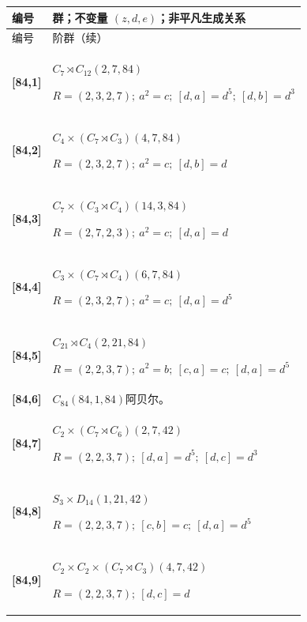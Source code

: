 \documentclass[UTF8,fontset=fandol,11pt,a4paper]{ctexart}
\begin{document}
\begin{longtable}{@{}p{17mm}>{\raggedright\arraybackslash}p{141mm}@{}}

\toprule 编号 & 群；不变量 $(z,d,e)$；非平凡生成关系\\\midrule\endfirsthead

\toprule 编号 & 84 阶群（续）\\\midrule\endhead\bottomrule\endfoot

\textbf{[84,1]} & $C_{7}\rtimes C_{12}$\quad $(2,7,84)$\par\(R=(2,3,2,7);\allowbreak\ a^{2}=c;\allowbreak\ [d,a]=d^{5};\allowbreak\ [d,b]=d^{3}\)\\[3pt]

\textbf{[84,2]} & $C_{4}\times (C_{7}\rtimes C_{3})$\quad $(4,7,84)$\par\(R=(2,3,2,7);\allowbreak\ a^{2}=c;\allowbreak\ [d,b]=d\)\\[3pt]

\textbf{[84,3]} & $C_{7}\times (C_{3}\rtimes C_{4})$\quad $(14,3,84)$\par\(R=(2,7,2,3);\allowbreak\ a^{2}=c;\allowbreak\ [d,a]=d\)\\[3pt]

\textbf{[84,4]} & $C_{3}\times (C_{7}\rtimes C_{4})$\quad $(6,7,84)$\par\(R=(2,3,2,7);\allowbreak\ a^{2}=c;\allowbreak\ [d,a]=d^{5}\)\\[3pt]

\textbf{[84,5]} & $C_{21}\rtimes C_{4}$\quad $(2,21,84)$\par\(R=(2,2,3,7);\allowbreak\ a^{2}=b;\allowbreak\ [c,a]=c;\allowbreak\ [d,a]=d^{5}\)\\[3pt]

\textbf{[84,6]} & $C_{84}$\quad $(84,1,84)$\quad 阿贝尔。\\[3pt]

\textbf{[84,7]} & $C_{2}\times (C_{7}\rtimes C_{6})$\quad $(2,7,42)$\par\(R=(2,2,3,7);\allowbreak\ [d,a]=d^{5};\allowbreak\ [d,c]=d^{3}\)\\[3pt]

\textbf{[84,8]} & $S_{3}\times D_{14}$\quad $(1,21,42)$\par\(R=(2,2,3,7);\allowbreak\ [c,b]=c;\allowbreak\ [d,a]=d^{5}\)\\[3pt]

\textbf{[84,9]} & $C_{2}\times C_{2}\times (C_{7}\rtimes C_{3})$\quad $(4,7,42)$\par\(R=(2,2,3,7);\allowbreak\ [d,c]=d\)\\[3pt]


\end{longtable}
\end{document}
